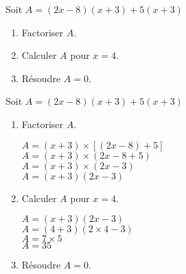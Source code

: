 \begin{exercice*}
    Soit $A=(2x-8)(x+3) + 5(x+3)$
    \begin{enumerate}
        \item Factoriser $A$.
        \item Calculer $A$ pour $x=4$.
        \item Résoudre $A=0$.
    \end{enumerate}
\end{exercice*}
\begin{corrige}
    Soit $A=(2x-8)(x+3) + 5(x+3)$

    \begin{enumerate}
        \item Factoriser $A$.
        
        $A=(x+3)\times[(2x-8)+5]$\\
        $A=(x+3)\times(2x-8+5)$\\
        $A=(x+3)\times(2x-3)$\\
        $A=(x+3)(2x-3)$
        \item Calculer $A$ pour $x=4$.
        
        $A=(x+3)(2x-3)$\\
        $A=(4+3)(2\times 4 -3)$\\
        $A=7\times 5$\\
        $A=35$
    \end{enumerate}
    \Coupe
    \begin{enumerate}
        \setcounter{enumi}{2}
        \item Résoudre $A=0$.
        
    \end{enumerate}
\end{corrige}
